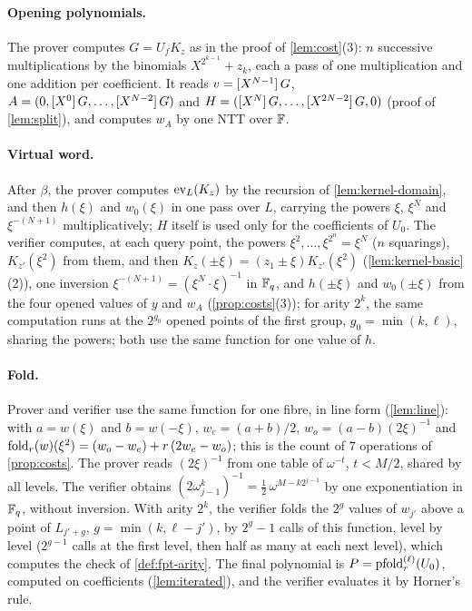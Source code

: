 \paragraph{Opening polynomials.}
The prover computes $G = U_f K_z$ as in the proof of \cref{lem:cost}(3): $n$ successive multiplications by the binomials $X^{2^{k-1}} + z_k$, each a pass of one multiplication and one addition per coefficient.
It reads $v = [X^{N-1}]\,G$, $A = (0, [X^{0}]\,G, \dots, [X^{N-2}]\,G)$ and $H = ([X^{N}]\,G, \dots, [X^{2N-2}]\,G, 0)$ (proof of \cref{lem:split}), and computes $w_A$ by one NTT over $\mathbb{F}$.

\paragraph{Virtual word.}
After $\beta$, the prover computes $\mathrm{ev}_L(K_z)$ by the recursion of \cref{lem:kernel-domain}, and then $h(\xi)$ and $w_0(\xi)$ in one pass over $L$, carrying the powers $\xi$, $\xi^N$ and $\xi^{-(N+1)}$ multiplicatively; $H$ itself is used only for the coefficients of $U_0$.
The verifier computes, at each query point, the powers $\xi^2, \dots, \xi^{2^n} = \xi^N$ ($n$ squarings), $K_{z'}(\xi^2)$ from them, and then $K_z(\pm\xi) = (z_1 \pm \xi)K_{z'}(\xi^2)$ (\cref{lem:kernel-basic}(2)), one inversion $\xi^{-(N+1)} = (\xi^N\cdot\xi)^{-1}$ in $\mathbb{F}_q$, and $h(\pm\xi)$ and $w_0(\pm\xi)$ from the four opened values of $y$ and $w_A$ (\cref{prop:costs}(3)); for arity $2^k$, the same computation runs at the $2^{g_0}$ opened points of the first group, $g_0 = \min(k, \ell)$, sharing the powers; both use the same function for one value of $h$.

\paragraph{Fold.}
Prover and verifier use the same function for one fibre, in line form (\cref{lem:line}): with $a = w(\xi)$ and $b = w(-\xi)$, $w_e = (a+b)/2$, $w_o = (a-b)(2\xi)^{-1}$ and $\mathrm{fold}_r(w)(\xi^2) = (w_o - w_e) + r\,(2w_e - w_o)$; this is the count of $7$ operations of \cref{prop:costs}.
The prover reads $(2\xi)^{-1}$ from one table of $\omega^{-t}$, $t < M/2$, shared by all levels.
The verifier obtains $(2\omega_{j-1}^{k})^{-1} = \tfrac12\,\omega^{M - k 2^{j-1}}$ by one exponentiation in $\mathbb{F}_q$, without inversion.
With arity $2^k$, the verifier folds the $2^{g}$ values of $w_{j'}$ above a point of $L_{j'+g}$, $g = \min(k, \ell - j')$, by $2^g - 1$ calls of this function, level by level ($2^{g-1}$ calls at the first level, then half as many at each next level), which computes the check of \cref{def:fpt-arity}.
The final polynomial is $P = \mathrm{pfold}^{(\ell)}_r(U_0)$, computed on coefficients (\cref{lem:iterated}), and the verifier evaluates it by Horner's rule.

